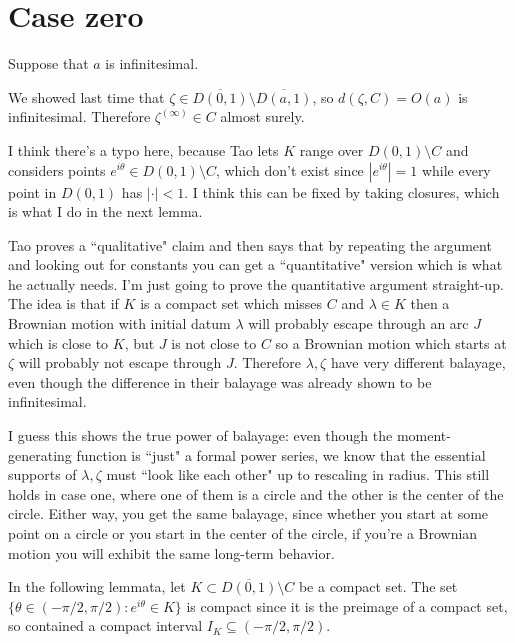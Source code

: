 \documentclass[12pt]{article}
\begin{document}
\section{Case zero}
Suppose that $a$ is infinitesimal.

We showed last time that $\zeta \in \overline{D(0, 1)} \setminus \overline{D(a, 1)}$, so $d(\zeta, C) = O(a)$ is infinitesimal.
Therefore $\zeta^{(\infty)} \in C$ almost surely.

I think there's a typo here, because Tao lets $K$ range over $D(0, 1) \setminus C$ and considers points $e^{i\theta} \in D(0, 1) \setminus C$, which don't exist since $|e^{i\theta}| = 1$ while every point in $D(0, 1)$ has $|\cdot| < 1$.
I think this can be fixed by taking closures, which is what I do in the next lemma.

Tao proves a ``qualitative" claim and then says that by repeating the argument and looking out for constants you can get a ``quantitative" version which is what he actually needs.
I'm just going to prove the quantitative argument straight-up.
The idea is that if $K$ is a compact set which misses $C$ and $\lambda \in K$ then a Brownian motion with initial datum $\lambda$ will probably escape through an arc $J$ which is close to $K$, but $J$ is not close to $C$ so a Brownian motion which starts at $\zeta$ will probably not escape through $J$.
Therefore $\lambda,\zeta$ have very different balayage, even though the difference in their balayage was already shown to be infinitesimal.

I guess this shows the true power of balayage: even though the moment-generating function is ``just" a formal power series, we know that the essential supports of $\lambda,\zeta$ must ``look like each other" up to rescaling in radius.
This still holds in case one, where one of them is a circle and the other is the center of the circle.
Either way, you get the same balayage, since whether you start at some point on a circle or you start in the center of the circle, if you're a Brownian motion you will exhibit the same long-term behavior.

In the following lemmata, let $K \subset \overline{D(0, 1)} \setminus C$ be a compact set.
The set $\{\theta \in (-\pi/2, \pi/2): e^{i\theta} \in K\}$ is compact since it is the preimage of a compact set, so contained a compact interval $I_K \subseteq (-\pi/2, \pi/2)$.
\end{document}
